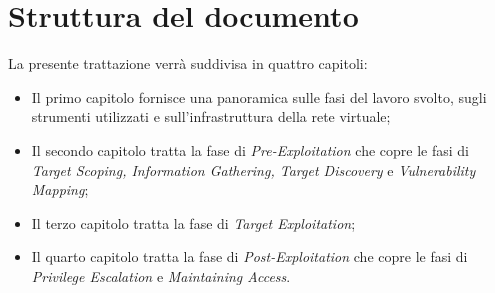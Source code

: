 \section{Struttura del documento}
La presente trattazione verrà suddivisa in quattro capitoli:
\begin{itemize}
    \item Il primo capitolo fornisce una panoramica sulle fasi del lavoro svolto, sugli strumenti utilizzati e sull'infrastruttura della rete virtuale;
    \item Il secondo capitolo tratta la fase di \emph{Pre-Exploitation} che copre le fasi di \emph{Target Scoping, Information Gathering, Target Discovery} e \emph{Vulnerability Mapping};
    \item Il terzo capitolo tratta la fase di \emph{Target Exploitation};
    \item Il quarto capitolo tratta la fase di \emph{Post-Exploitation} che copre le fasi di \emph{Privilege Escalation} e \emph{Maintaining Access}.
\end{itemize}